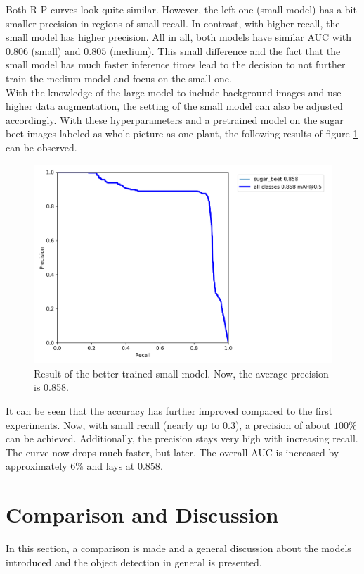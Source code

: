 Both R-P-curves look quite similar. However, the left one (small model) has a bit smaller precision in regions of small recall. In contrast, with higher recall, the small model has higher precision. All in all, both models have similar AUC with $ 0.806 $ (small) and $ 0.805 $ (medium). This small difference and the fact that the small model has much faster inference times lead to the decision to not further train the medium model and focus on the small one. \\

With the knowledge of the large model to include background images and use higher data augmentation, the setting of the small model can also be adjusted accordingly. With these hyperparameters and a pretrained model on the sugar beet images labeled as whole picture as one plant, the following results of figure \ref{fig:result_small_one} can be observed. 

\begin{figure}[htb!]
	\centering
	\includegraphics[scale=0.15]{figures/result_small.png}
	\caption{Result of the better trained small model. Now, the average precision is 0.858.}
	\label{fig:result_small_one}
\end{figure}

It can be seen that the accuracy has further improved compared to the first experiments. Now, with small recall (nearly up to 0.3), a precision of about $ 100\% $ can be achieved. Additionally, the precision stays very high with increasing recall. The curve now drops much faster, but later. The overall AUC is increased by approximately $ 6\% $ and lays at $ 0.858 $.

\section{Comparison and Discussion}
In this section, a comparison is made and a general discussion about the models introduced and the object detection in general is presented.

